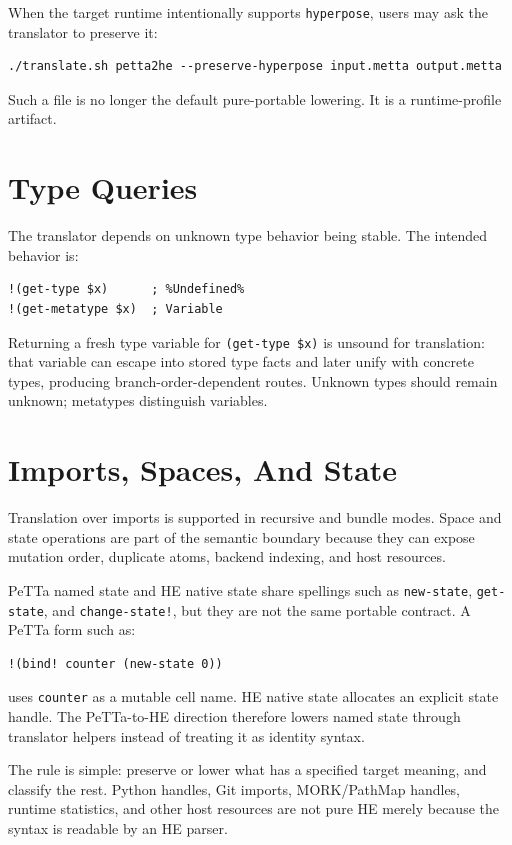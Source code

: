\documentclass[11pt]{article}
\newcommand{\code}[1]{\texttt{#1}}
\newcommand{\HE}{\textup{HE}}
\newcommand{\PeTTa}{\textup{PeTTa}}
\begin{document}
When the target runtime intentionally supports \code{hyperpose}, users may ask
the translator to preserve it:

\begin{lstlisting}
./translate.sh petta2he --preserve-hyperpose input.metta output.metta
\end{lstlisting}

Such a file is no longer the default pure-portable lowering.  It is a
runtime-profile artifact.

\section{Type Queries}

The translator depends on unknown type behavior being stable.  The intended
behavior is:

\begin{lstlisting}
!(get-type $x)      ; %Undefined%
!(get-metatype $x)  ; Variable
\end{lstlisting}

Returning a fresh type variable for \code{(get-type \$x)} is unsound for
translation: that variable can escape into stored type facts and later unify
with concrete types, producing branch-order-dependent routes.  Unknown types
should remain unknown; metatypes distinguish variables.

\section{Imports, Spaces, And State}

Translation over imports is supported in recursive and bundle modes.  Space and
state operations are part of the semantic boundary because they can expose
mutation order, duplicate atoms, backend indexing, and host resources.

\PeTTa{} named state and \HE{} native state share spellings such as
\code{new-state}, \code{get-state}, and \code{change-state!}, but they are not
the same portable contract.  A \PeTTa{} form such as:
\begin{lstlisting}
!(bind! counter (new-state 0))
\end{lstlisting}
uses \code{counter} as a mutable cell name.  \HE{} native state allocates an
explicit state handle.  The \PeTTa{}-to-\HE{} direction therefore lowers named
state through translator helpers instead of treating it as identity syntax.

The rule is simple: preserve or lower what has a specified target meaning, and
classify the rest.  Python handles, Git imports, MORK/PathMap handles, runtime
statistics, and other host resources are not pure \HE{} merely because the
syntax is readable by an \HE{} parser.
\end{document}
